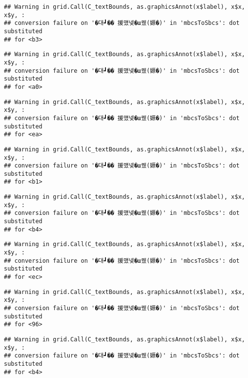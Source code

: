 \documentclass[
]{article}
\begin{document}
\begin{verbatim}
## Warning in grid.Call(C_textBounds, as.graphicsAnnot(x$label), x$x, x$y, :
## conversion failure on '�대┛�� 援먰넻�ш퀬(嫄�)' in 'mbcsToSbcs': dot substituted
## for <b3>
\end{verbatim}

\begin{verbatim}
## Warning in grid.Call(C_textBounds, as.graphicsAnnot(x$label), x$x, x$y, :
## conversion failure on '�대┛�� 援먰넻�ш퀬(嫄�)' in 'mbcsToSbcs': dot substituted
## for <a0>
\end{verbatim}

\begin{verbatim}
## Warning in grid.Call(C_textBounds, as.graphicsAnnot(x$label), x$x, x$y, :
## conversion failure on '�대┛�� 援먰넻�ш퀬(嫄�)' in 'mbcsToSbcs': dot substituted
## for <ea>
\end{verbatim}

\begin{verbatim}
## Warning in grid.Call(C_textBounds, as.graphicsAnnot(x$label), x$x, x$y, :
## conversion failure on '�대┛�� 援먰넻�ш퀬(嫄�)' in 'mbcsToSbcs': dot substituted
## for <b1>
\end{verbatim}

\begin{verbatim}
## Warning in grid.Call(C_textBounds, as.graphicsAnnot(x$label), x$x, x$y, :
## conversion failure on '�대┛�� 援먰넻�ш퀬(嫄�)' in 'mbcsToSbcs': dot substituted
## for <b4>
\end{verbatim}

\begin{verbatim}
## Warning in grid.Call(C_textBounds, as.graphicsAnnot(x$label), x$x, x$y, :
## conversion failure on '�대┛�� 援먰넻�ш퀬(嫄�)' in 'mbcsToSbcs': dot substituted
## for <ec>
\end{verbatim}

\begin{verbatim}
## Warning in grid.Call(C_textBounds, as.graphicsAnnot(x$label), x$x, x$y, :
## conversion failure on '�대┛�� 援먰넻�ш퀬(嫄�)' in 'mbcsToSbcs': dot substituted
## for <96>
\end{verbatim}

\begin{verbatim}
## Warning in grid.Call(C_textBounds, as.graphicsAnnot(x$label), x$x, x$y, :
## conversion failure on '�대┛�� 援먰넻�ш퀬(嫄�)' in 'mbcsToSbcs': dot substituted
## for <b4>
\end{verbatim}
\end{document}
